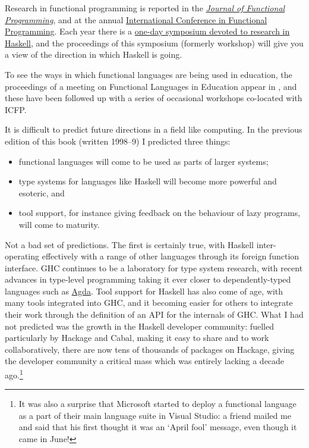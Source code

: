 Research in functional programming is reported in the \href{https://jfp.episciences.org/}{\emph{Journal
of Functional Programming}}, and at the annual
\href{https://www.icfpconference.org/}{International Conference in Functional Programming}.
Each year there is a \href{https://www.haskell.org/haskell-symposium/}{one-day symposium devoted to research in Haskell},
and the proceedings of this symposium (formerly workshop) will give you a view of the direction in which Haskell is going.

To see the ways in which functional
languages are being used in education, the proceedings of a meeting on
Functional Languages in Education appear in , and these
have been followed up with a series of occasional workshops co-located with ICFP.

It is difficult to predict future directions in a field like computing. In the previous edition of this book (written 1998--9) I predicted three things:
\begin{itemize}
\item functional languages will come to be used as parts of larger systems;
\item type systems for languages like Haskell will become more powerful and esoteric, and
\item tool support, for instance giving feedback on the behaviour of lazy programs, will come to maturity.
\end{itemize}
Not a bad set of predictions. The first is certainly true, with Haskell inter-operating effectively with a range of other languages through its foreign function interface. GHC continues to be a laboratory for type system research, with recent advances in type-level programming taking it ever closer to dependently-typed languages such as \href{https://wiki.portal.chalmers.se/agda/}{Agda}.
Tool support for Haskell has also come of age, with many tools integrated into GHC, and it becoming easier for others to integrate their work through the definition of an API for the internals of GHC. What I had not predicted was the growth in the Haskell developer community: fuelled particularly by Hackage and Cabal, making it easy to share and to work collaboratively, there are now tens of thousands of packages on Hackage, giving the developer community a critical mass which was entirely lacking a decade ago.\footnote{It was also a surprise that Microsoft started to deploy a functional language as a part of their main language suite in Visual Studio: a friend mailed me and said that his first thought it was an `April fool' message, even though it came in June!}


